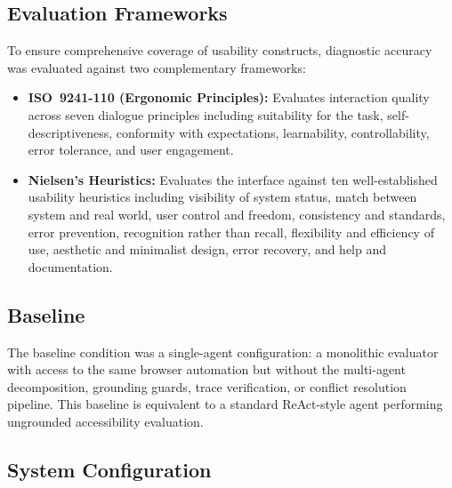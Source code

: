 \subsection{Evaluation Frameworks}
\label{sec:eval-frameworks}

To ensure comprehensive coverage of usability constructs, diagnostic accuracy was evaluated against two complementary frameworks:
\begin{itemize}
  \item \textbf{ISO~9241-110 (Ergonomic Principles):} Evaluates interaction quality across seven dialogue principles including suitability for the task, self-descriptiveness, conformity with expectations, learnability, controllability, error tolerance, and user engagement.
  \item \textbf{Nielsen's Heuristics:} Evaluates the interface against ten well-established usability heuristics including visibility of system status, match between system and real world, user control and freedom, consistency and standards, error prevention, recognition rather than recall, flexibility and efficiency of use, aesthetic and minimalist design, error recovery, and help and documentation.
\end{itemize}

\subsection{Baseline}
\label{sec:baseline}

The baseline condition was a single-agent configuration: a monolithic  evaluator with access to the same browser automation but without the multi-agent decomposition, grounding guards, trace verification, or conflict resolution pipeline. This baseline is equivalent to a standard ReAct-style agent performing ungrounded accessibility evaluation.

\subsection{System Configuration}
\label{sec:system-config}

